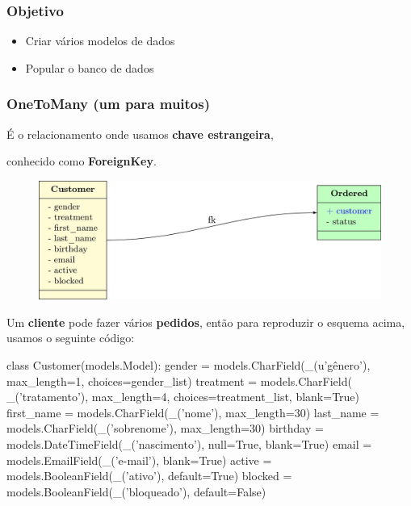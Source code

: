 \documentclass[aspectratio=169]{beamer}
\begin{document}
{\begin{frame}
\end{frame}



\begin{frame}\frametitle{Objetivo}
	\begin{itemize}
		\item Criar vários modelos de dados
		\item Popular o banco de dados
	\end{itemize}
\end{frame}

\begin{frame}\frametitle{OneToMany (um para muitos)}
	

É o relacionamento onde usamos \textbf{chave estrangeira},

conhecido como \textbf{ForeignKey}.

	\begin{figure}[h]
	  \centering
  		\includegraphics[width=.8\paperwidth]{img/01fk.jpg}
	\end{figure}

Um \textbf{cliente} pode fazer vários \textbf{pedidos}, então para reproduzir o esquema acima, usamos o seguinte código:

\end{frame}

\begin{frame}[fragile]

\begin{pythoncode}
class Customer(models.Model):
    gender = models.CharField(_(u'gênero'), max_length=1, choices=gender_list)
    treatment = models.CharField(
        _('tratamento'), max_length=4, choices=treatment_list, blank=True)
    first_name = models.CharField(_('nome'), max_length=30)
    last_name = models.CharField(_('sobrenome'), max_length=30)
    birthday = models.DateTimeField(_('nascimento'), null=True, blank=True)
    email = models.EmailField(_('e-mail'), blank=True)
    active = models.BooleanField(_('ativo'), default=True)
    blocked = models.BooleanField(_('bloqueado'), default=False)



\end{pythoncode}
\end{frame}}
\end{document}
